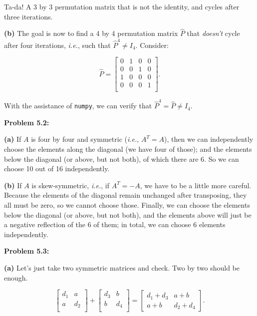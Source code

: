 \documentclass{article}
\begin{document}
Ta-da! A 3 by 3 permutation matrix that is not the identity, and cycles after three iterations.

\noindent \textbf{(b)} The goal is now to find a 4 by 4 permutation matrix $\widehat{P}$ that \textit{doesn't} cycle after four iterations, \textit{i.e.}, such that $\widehat{P}^{4} \neq I_4$. Consider:

\[
\widehat{P} = \begin{bmatrix}
0 & 1 & 0 & 0\\
0 & 0 & 1 & 0\\
1 & 0 & 0 & 0\\
0 & 0 & 0 & 1\\
\end{bmatrix}.
\]

With the assistance of \texttt{numpy}, we can verify that $\widehat{P}^{4} = \widehat{P} \neq I_4$.

\noindent \textbf{Problem 5.2:}

\noindent \textbf{(a)} If $A$ is four by four and symmetric (\textit{i.e.}, $A^{T} = A$), then we can independently choose the elements along the diagonal (we have four of those); and the elements below the diagonal (or above, but not both), of which there are 6. So we can choose 10 out of 16 independently.

\noindent \textbf{(b)} If $A$ is skew-symmetric, \textit{i.e.}, if $A^{T} = -A$, we have to be a little more careful. Because the elements of the diagonal remain unchanged after transposing, they all must be zero, so we cannot choose those. Finally, we can choose the elements below the diagonal (or above, but not both), and the elements above will just be a negative reflection of the 6 of them; in total, we can choose 6 elements independently.

\noindent \textbf{Problem 5.3:}

\noindent \textbf{(a)} Let's just take two symmetric matrices and check. Two by two should be enough.

\[
\begin{bmatrix}
d_1 & a\\
a & d_2\\
\end{bmatrix}
+
\begin{bmatrix}
d_3 & b\\
b & d_4\\
\end{bmatrix}
=
\begin{bmatrix}
d_1 + d_3 & a + b\\
a + b & d_2 + d_4
\end{bmatrix}.
\]
\end{document}
